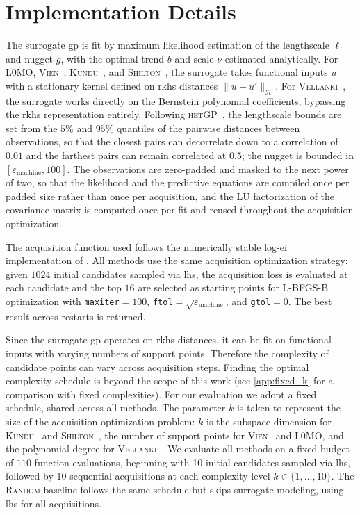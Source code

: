\documentclass{article}
\newcommand{\wycoff}{\textsc{L0MO}}
\newcommand{\vien}{\textsc{Vien}~\cite{vien2018bayesian}}
\newcommand{\vellanky}{\textsc{Vellanki}~\cite{vellanki2019bayesian}}
\newcommand{\kundu}{\textsc{Kundu}~\cite{kundu2025active}}
\newcommand{\shilton}{\textsc{Shilton}~\cite{shilton2020sequential}}
\newcommand{\random}{\textsc{Random}}
\newcommand{\Hs}{\mathcal{H}}
\newcommand{\vu}{u}
\begin{document}
\FloatBarrier
\section{Implementation Details}
\label{app:implementation}

The surrogate \gls{gp} is fit by maximum likelihood estimation of the lengthscale $\ell$ and nugget $g$, with the optimal trend $b$ and scale $\nu$ estimated analytically. For \wycoff, \vien, \kundu, and \shilton, the surrogate takes functional inputs $\vu$ with a stationary kernel defined on \gls{rkhs} distances $\|\vu - \vu'\|_\Hs$. For \vellanky, the surrogate works directly on the Bernstein polynomial coefficients, bypassing the \gls{rkhs} representation entirely.
Following \textsc{hetGP}~\citep{binois2021hetgp}, the lengthscale bounds are set from the $5\%$ and $95\%$ quantiles of the pairwise distances between observations, so that the closest pairs can decorrelate down to a correlation of $0.01$ and the farthest pairs can remain correlated at $0.5$; the nugget is bounded in $[\varepsilon_{\textrm{machine}}, 100]$.
The observations are zero-padded and masked to the next power of two, so that the likelihood and the predictive equations are compiled once per padded size rather than once per acquisition, and the LU factorization of the covariance matrix is computed once per fit and reused throughout the acquisition optimization.

The acquisition function used follows the numerically stable log-\gls{ei} implementation of \cite{ament2024logei}.
All methods use the same acquisition optimization strategy: given $1024$ initial candidates sampled via \gls{lhs}, the acquisition loss is evaluated at each candidate and the top $16$ are selected as starting points for L-BFGS-B optimization with \texttt{maxiter}$=100$, \texttt{ftol}$=\sqrt{\varepsilon_{\textrm{machine}}}$, and \texttt{gtol}$=0$. The best result across restarts is returned.

Since the surrogate \gls{gp} operates on \gls{rkhs} distances, it can be fit on functional inputs with varying numbers of support points. Therefore the complexity of candidate points can vary across acquisition steps.
Finding the optimal complexity schedule is beyond the scope of this work (see \cref{app:fixed_k} for a comparison with fixed complexities). For our evaluation we adopt a fixed schedule, shared across all methods. The parameter $k$ is taken to represent the size of the acquisition optimization problem: $k$ is the subspace dimension for \kundu{} and \shilton, the number of support points for \vien{} and \wycoff, and the polynomial degree for \vellanky.
We evaluate all methods on a fixed budget of $110$ function evaluations, beginning with 10 initial candidates sampled via \gls{lhs}, followed by 10 sequential acquisitions at each complexity level $k \in \{1, \ldots, 10\}$.
The \random{} baseline follows the same schedule but skips surrogate modeling, using \gls{lhs} for all acquisitions.
\end{document}

